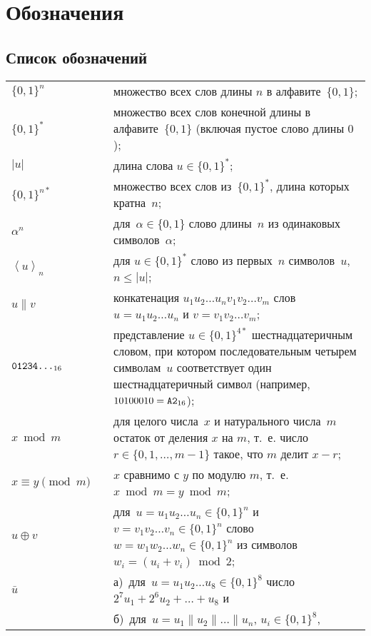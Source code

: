 \chapter{Обозначения}\label{DEFS}

\section{Список обозначений}

{\tabcolsep 0pt
\begin{longtable}{lrp{13.5cm}}
$\{0,1\}^n$  & \hspace{2mm} &
множество всех слов длины $n$ в алфавите~$\{0,1\}$;
\\[4pt]
$\{0,1\}^*$  &&
множество всех слов конечной длины в алфавите~$\{0,1\}$
(включая пустое слово длины $0$);
\\[4pt]
$|u|$      &&
длина слова $u\in\{0,1\}^*$;
\\[4pt]
%
$\{0,1\}^{n*}$  &&
множество всех слов из~$\{0,1\}^*$,
длина которых кратна~$n$;
\\[4pt]
%
$\alpha^n$  &&
для~$\alpha\in\{0,1\}$
слово длины~$n$ из одинаковых символов~$\alpha$;
\\[4pt]
%
%
$\left\langle u\right\rangle_n$  &&
для $u\in\{0,1\}^*$
слово из первых~$n$ символов~$u$, $n\leq|u|$;
\\[4pt]
%
$u\parallel v$  &&
конкатенация
$u_1 u_2\ldots u_n v_1 v_2\ldots v_m$
слов
$u=u_1 u_2\ldots u_n$ и
$v=v_1 v_2\ldots v_m$;
\\[4pt]
%
$\texttt{01234\ldots}_{16}$ && 
представление $u\in\{0,1\}^{4*}$ шестнадцатеричным словом,
при котором последовательным четырем символам~$u$ соответствует
один шестнадцатеричный символ
(например, $10100010=\texttt{A2}_{16}$);
\\[4pt]
%
$x\bmod m$             &&
для целого числа~$x$ и натурального числа~$m$ 
остаток от деления $x$ на $m$,
т.~е. число $r\in\{0,1,\ldots,m-1\}$ такое, что $m$ делит $x-r$;
\\[4pt]
%
$x\equiv y\pmod m$    &&
$x$ сравнимо с $y$ по модулю $m$, т.~е. $x\bmod m=y\bmod m$;
\\[4pt]
%
$u\oplus v$             &&
для~$u=u_1 u_2\ldots u_n\in\{0,1\}^n$ 
и~$v=v_1 v_2\ldots v_n\in\{0,1\}^n$
слово~$w=w_1 w_2\ldots w_n\in\{0,1\}^n$
из символов~$w_i=(u_i+v_i)\bmod{2}$;
\\[4pt]
%
$\bar u$                &&
а)~для~$u=u_1 u_2\ldots u_8\in\{0,1\}^8$
число $2^7 u_1+2^6 u_2+\ldots+u_8$ и\\[2pt]
%
                        &&
б)~для~$u=u_1\parallel u_2\parallel\ldots\parallel u_n$, $u_i\in\{0,1\}^8$,

\end{longtable}}

